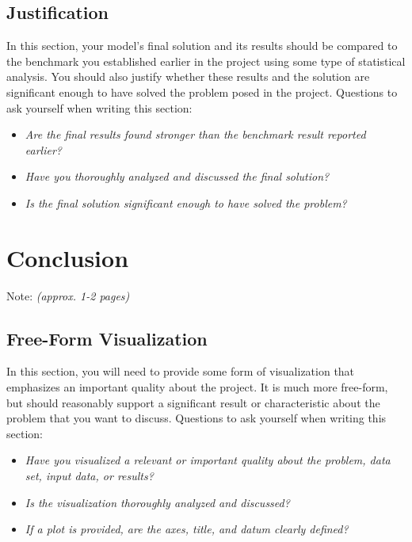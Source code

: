 \documentclass{article}
\begin{document}
\subsection{Justification}\label{justification}

In this section, your model's final solution and its results should be
compared to the benchmark you established earlier in the project using
some type of statistical analysis. You should also justify whether these
results and the solution are significant enough to have solved the
problem posed in the project. Questions to ask yourself when writing
this section:

\begin{itemize}
\item
  \emph{Are the final results found stronger than the benchmark result
  reported earlier?}
\item
  \emph{Have you thoroughly analyzed and discussed the final solution?}
\item
  \emph{Is the final solution significant enough to have solved the
  problem?}
\end{itemize}

\section{Conclusion}\label{conclusion}

Note: \emph{(approx. 1-2 pages)}


\subsection{Free-Form Visualization}\label{free-form-visualization}

In this section, you will need to provide some form of visualization
that emphasizes an important quality about the project. It is much more
free-form, but should reasonably support a significant result or
characteristic about the problem that you want to discuss. Questions to
ask yourself when writing this section:

\begin{itemize}
\item
  \emph{Have you visualized a relevant or important quality about the
  problem, data set, input data, or results?}
\item
  \emph{Is the visualization thoroughly analyzed and discussed?}
\item
  \emph{If a plot is provided, are the axes, title, and datum clearly
  defined?}
\end{itemize}
\end{document}
